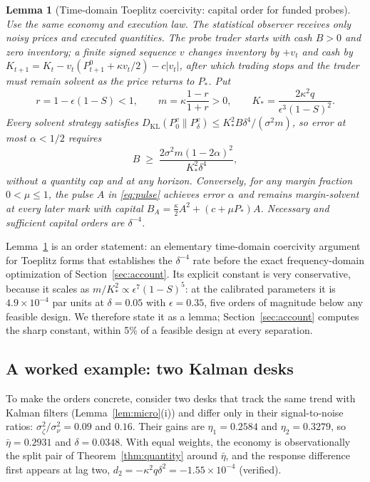 \documentclass[12pt]{article}
\newtheorem{lemma}[theorem]{Lemma}
\theoremstyle{definition}
\theoremstyle{remark}
\newcommand{\KL}{D_{\mathrm{KL}}}
\begin{document}
\begin{lemma}[Time-domain Toeplitz coercivity: capital order for funded probes]\label{thm:capital}
Use the same economy and execution law. The statistical observer receives only noisy prices and executed quantities. The probe trader starts with cash $B>0$ and zero inventory; a finite signed sequence $v$ changes inventory by $+v_t$ and cash by $K_{t+1}=K_t-v_t(P^0_{t+1}+\kappa v_t/2)-c|v_t|$, after which trading stops and the trader must remain solvent as the price returns to $P_*$. Put
\[
r=1-\epsilon(1-S)<1,\qquad m=\kappa\frac{1-r}{1+r}>0,\qquad K_*=\frac{2\kappa^2q}{\epsilon^3(1-S)^2}.
\]
Every solvent strategy satisfies $\KL(P_0^v\|P_\delta^v)\le K_*^2B\delta^4/(\sigma^2m)$, so error at most $\alpha<1/2$ requires
\begin{equation}\label{eq:Bmin}
B\;\ge\;\frac{2\sigma^2m(1-2\alpha)^2}{K_*^2\delta^4},
\end{equation}
without a quantity cap and at any horizon. Conversely, for any margin fraction $0<\mu\le1$, the pulse $A$ in \eqref{eq:pulse} achieves error $\alpha$ and remains margin-solvent at every later mark with capital $B_A=\tfrac{\kappa}{2}A^2+(c+\mu P_*)A$. Necessary and sufficient capital orders are $\delta^{-4}$.
\end{lemma}

Lemma~\ref{thm:capital} is an order statement: an elementary time-domain coercivity argument for Toeplitz forms that establishes the $\delta^{-4}$ rate before the exact frequency-domain optimization of Section~\ref{sec:account}. Its explicit constant is very conservative, because it scales as $m/K_*^2\propto\epsilon^7(1-S)^5$: at the calibrated parameters it is $4.9\times10^{-4}$ par units at $\delta=0.05$ with $\epsilon=0.35$, five orders of magnitude below any feasible design. We therefore state it as a lemma; Section~\ref{sec:account} computes the sharp constant, within 5\% of a feasible design at every separation.

\subsection{A worked example: two Kalman desks}\label{sec:worked}

To make the orders concrete, consider two desks that track the same trend with Kalman filters (Lemma~\ref{lem:micro}(i)) and differ only in their signal-to-noise ratios: $\sigma_\zeta^2/\sigma_\nu^2=0.09$ and $0.16$. Their gains are $\eta_1=0.2584$ and $\eta_2=0.3279$, so $\bar\eta=0.2931$ and $\delta=0.0348$. With equal weights, the economy is observationally the split pair of Theorem~\ref{thm:quantity} around $\bar\eta$, and the response difference first appears at lag two, $d_2=-\kappa^2q\delta^2=-1.55\times10^{-4}$ (verified).
\end{document}

